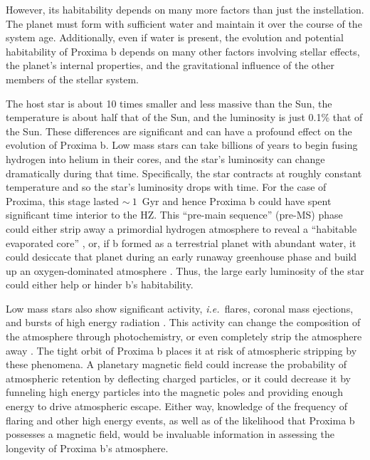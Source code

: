 \documentclass[preprint,12pt]{aastex}
\def\eg{{\it e.g.\ }}
\def\ie{{\it i.e.\ }}
\begin{document}
However, its habitability depends on many more factors than just the
instellation. The planet must form with sufficient water and maintain
it over the course of the system age. Additionally, even if water is present,
the evolution and potential habitability of Proxima b depends on many
other factors involving stellar effects, the planet's internal properties, and the
gravitational influence of the other members of the stellar system.

The host star is about 10 times smaller and less massive than the Sun,
the temperature is about half that of the Sun, and the luminosity is
just 0.1\% that of the Sun. These differences are significant and can
have a profound effect on the evolution of Proxima b. Low mass stars
can take billions of years to begin fusing hydrogen into helium in
their cores, and the star's luminosity can change dramatically during that
time. Specifically, the star contracts at roughly constant temperature and so
the star's luminosity drops with time. For the case of Proxima, this
stage lasted $\sim~1$~Gyr \citep{Baraffe15} and hence Proxima b
could have spent significant time interior to the HZ. This ``pre-main sequence'' (pre-MS) phase could
either strip away a primordial hydrogen atmosphere to reveal a
``habitable evaporated core'' \citep{Luger15}, or, if b formed as a
terrestrial planet with abundant water, it could desiccate that planet during an early runaway greenhouse phase and build up an
oxygen-dominated atmosphere \citep{LugerBarnes15}. Thus, the large
early luminosity of the star could either help or hinder
b's habitability.

Low mass stars also show significant activity, \ie flares, coronal
mass ejections, and bursts of high energy radiation
\citep[\eg][]{West08}. This activity can change the composition of the
atmosphere through photochemistry, or even completely strip the
atmosphere away \citep{Raymond06}. The tight orbit of Proxima b places
it at risk of atmospheric stripping by these phenomena. A planetary
magnetic field could increase the probability of atmospheric retention
by deflecting charged particles, or it could decrease it by funneling
high energy particles into the magnetic poles and providing enough
energy to drive atmospheric escape. Either
way, knowledge of the frequency of flaring and other high energy
events, as well as of the likelihood that Proxima b possesses a
magnetic field, would be invaluable information in assessing the
longevity of Proxima b's atmosphere.
\end{document}
